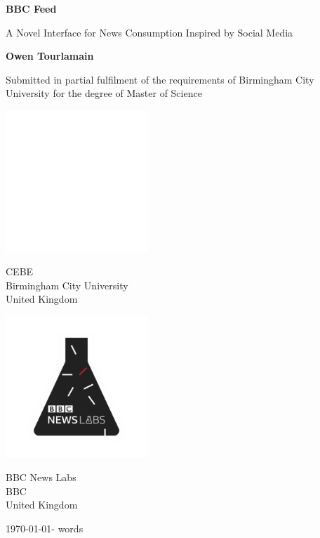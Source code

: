 \documentclass[12pt,titlepage]{article}
\newcommand\wordcount{}
\newcommand\NLStart[1]{\AtPageLowerLeft{%
\put(\LenToUnit{.505\paperwidth},\LenToUnit{.12\paperheight}){#1}%
}}%
\newcommand\BCUStart[1]{\AtPageLowerLeft{%
 \put(\LenToUnit{0\paperwidth},\LenToUnit{.12\paperheight}){#1}%
 }}%
\begin{document}
\begin{titlepage}
  \AddToShipoutPictureBG*{
    \BCUStart{\color{bcublue}\rule{.495\paperwidth}{.32\paperheight}}
    \NLStart{\color{bbcnewsred}\rule{.5\paperwidth}{.32\paperheight}}
  }
	\begin{center}
		\vspace*{1cm}

		\begingroup
      \fontsize{24}{30}\selectfont
      \textbf{BBC Feed}
    \endgroup

    \begingroup
      \fontsize{18}{22}\selectfont
      A Novel Interface for News Consumption Inspired by Social Media
    \endgroup

		\vspace{2cm}

		\textbf{Owen Tourlamain}

		\vfill

		Submitted in partial fulfilment of the requirements of Birmingham City University for the degree of Master of Science

		\vspace{0.8cm}

    \begin{multicols}{2}

      \color{white}

  		\includegraphics[width=0.4\textwidth]{../img/bcu-logo.png}

      CEBE\\
  		Birmingham City University\\
  		United Kingdom\\
      \columnbreak

      \includegraphics[width=0.4\textwidth]{../img/nl-logo.png}

  		BBC News Labs\\
  		BBC\\
  		United Kingdom\\

    \end{multicols}

    \today - \wordcount words

	\end{center}
\end{titlepage}
\end{document}
